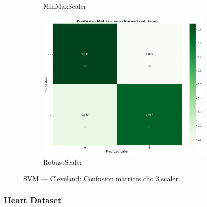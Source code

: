 \begin{figure}[H]
\begin{subfigure}[b]{0.31\textwidth}
\caption{MinMaxScaler}\label{fig:svm_clev_cm_minmax}
\end{subfigure}\hfill
\begin{subfigure}[b]{0.31\textwidth}\centering
\includegraphics[width=0.95\textwidth]{Result/cleveland_dataset/confusion_matrices/svm_numeric_dataset_RobustScaler.png}
\caption{RobustScaler}\label{fig:svm_clev_cm_robust}
\end{subfigure}
\caption{SVM — Cleveland: Confusion matrices cho 3 scaler.}
\label{fig:svm_clev_confusions}
\end{figure}

\FloatBarrier

\subsubsection{Heart Dataset}\label{subsubsec:svm-heart}

